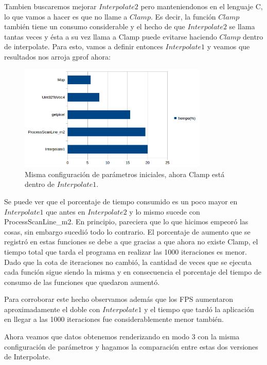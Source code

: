 \documentclass[a4paper]{article}
\begin{document}
Tambien buscaremos mejorar $Interpolate2$ pero manteniendonos en el lenguaje C, lo que vamos a hacer es que no llame a $Clamp$. Es decir, la función $Clamp$ también tiene un consumo considerable y el hecho de que $Interpolate2$ se llama tantas veces y ésta a su vez llama a Clamp puede evitarse haciendo $Clamp$ dentro de interpolate. Para esto, vamos a definir entonces $Interpolate1$ y veamos que resultados nos arroja gprof ahora:

\begin{figure}[h]
    \centering
    \includegraphics[width=0.8\textwidth]{Imagenes/gprof2.png}
    \caption{Misma configuración de parámetros iniciales, ahora Clamp está dentro de $Interpolate1$.}
    \label{fig:mesh1}
\end{figure}

Se puede ver que el porcentaje de tiempo consumido es un poco mayor en $Interpolate1$ que antes en $Interpolate2$ y lo mismo sucede con ProcessScanLine_m2. En principio, pareciera que lo que hicimos empeoró las cosas, sin embargo sucedió todo lo contrario. El porcentaje de aumento que se registró en estas funciones se debe a que gracias a que ahora no existe Clamp, el tiempo total que tarda el programa en realizar las 1000 iteraciones es menor. Dado que la cota de iteraciones no cambió, la cantidad de veces que se ejecuta cada función sigue siendo la misma y en consecuencia el porcentaje del tiempo de consumo de las funciones que quedaron aumentó.

Para corroborar este hecho observamos además que los FPS aumentaron aproximadamente el doble con $Interpolate1$ y el tiempo que tardó la aplicación en llegar a las 1000 iteraciones fue considerablemente menor también.

Ahora veamos que datos obtenemos renderizando en modo 3 con la misma configuración de parámetros y hagamos la comparación entre estas dos versiones de Interpolate.
\end{document}
